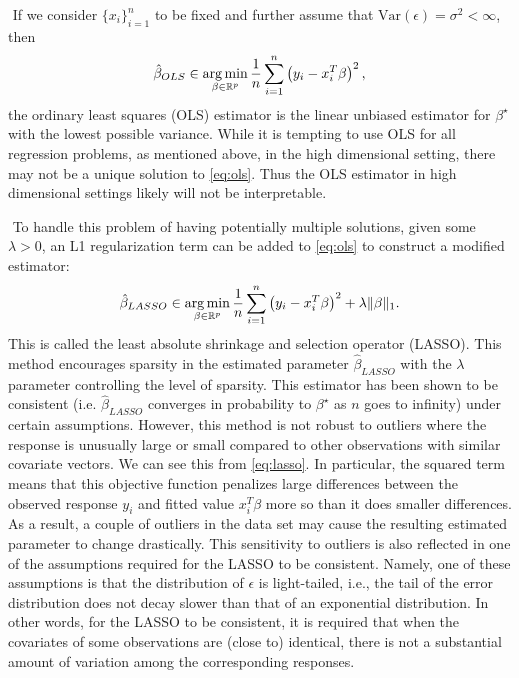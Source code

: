 $ $\newline
If we consider $\{x_i\}_{i=1}^n$ to be fixed and further assume that $\text{Var}(\epsilon) = \sigma^2 < \infty$, then
\begin{align}
\hat{\beta}_{OLS} \in \argmin_{\beta\in\mathbb{R}^p}\frac{1}{n}\sum_{i=1}^n \left( y_i - x_i^T\beta \right)^2, \label{eq:ols}
\end{align}
the ordinary least squares (OLS) estimator is the linear unbiased estimator for $\beta^\star$ with the lowest possible variance. While it is tempting to use OLS for all regression problems, as mentioned above, in the high dimensional setting, there may not be a unique solution to \cref{eq:ols}. Thus the OLS estimator in high dimensional settings likely will not be interpretable.

$ $\newline
To handle this problem of having potentially multiple solutions, given some $\lambda>0$, an L1 regularization term can be added to \cref{eq:ols} to construct a modified estimator:
\begin{align}
\hat{\beta}_{LASSO} \in \argmin_{\beta\in\mathbb{R}^p} \frac{1}{n}\sum_{i=1}^n \left( y_i - x_i^T\beta \right)^2 + \lambda\|\beta\|_1. \label{eq:lasso}
\end{align}
This is called the least absolute shrinkage and selection operator (LASSO). This method encourages sparsity in the estimated parameter $\hat{\beta}_{LASSO}$ with the $\lambda$ parameter controlling the level of sparsity. This estimator has been shown to be consistent (i.e. $\hat{\beta}_{LASSO}$ converges in probability to $\beta^\star$ as $n$ goes to infinity) under certain assumptions. However, this method is not robust to outliers where the response is unusually large or small compared to other observations with similar covariate vectors. We can see this from \cref{eq:lasso}. In particular, the squared term means that this objective function penalizes large differences between the observed response $y_i$ and fitted value $x_i^T\beta$ more so than it does smaller differences. As a result, a couple of outliers in the data set may cause the resulting estimated parameter to change drastically. This sensitivity to outliers is also reflected in one of the assumptions required for the LASSO to be consistent. Namely, one of these assumptions is that the distribution of $\epsilon$ is light-tailed, i.e., the tail of the error distribution does not decay slower than that of an exponential distribution. In other words, for the LASSO to be consistent, it is required that when the covariates of some observations are (close to) identical, there is not a substantial amount of variation among the corresponding responses. 

